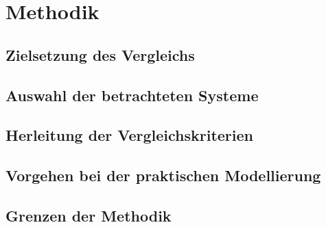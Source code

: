 %

\chapter{Methodik}
\label{sec:methodology}

\section{Zielsetzung des Vergleichs}
\label{sec:methodology:goal}

\section{Auswahl der betrachteten Systeme}
\label{sec:methodology:selection}

\section{Herleitung der Vergleichskriterien}
\label{sec:methodology:criteria}

\section{Vorgehen bei der praktischen Modellierung}
\label{sec:methodology:procedure}

\section{Grenzen der Methodik}
\label{sec:methodology:limits}